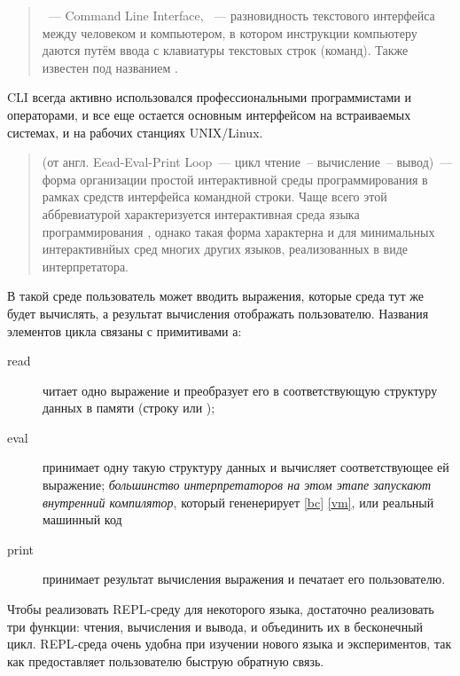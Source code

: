 \label{forth}\secdown

\begin{quotation}\noindent
{}\ --- Command Line Interface, \ ---
разновидность текстового интерфейса между человеком и компьютером, в котором
инструкции компьютеру даются путём ввода с клавиатуры текстовых строк (команд).
Также известен под названием .
\end{quotation}

\noindent
CLI всегда активно использовался профессиональными программистами и операторами,
и все еще остается основным интерфейсом на встраиваемых системах, и на рабочих
станциях UNIX/Linux.

\begin{quotation}\noindent
{} (от англ. Eead-Eval-Print Loop\ --- цикл чтение\ -- вычисление\ --
вывод)\ --- форма организации простой интерактивной среды программирования в
рамках средств интерфейса командной строки. Чаще всего этой аббревиатурой
характеризуется интерактивная среда языка программирования \lisp, однако такая
форма характерна и для минимальных интерактивнйых сред многих других языков,
реализованных в виде интерпретатора.
\end{quotation}

\clearpage
\noindent
В такой среде пользователь может вводить выражения, которые среда тут же будет
вычислять, а результат вычисления отображать пользователю. Названия элементов
цикла связаны с примитивами \lisp а:

\begin{description}
\item[read] читает одно выражение и преобразует его в соответствующую структуру
данных в памяти (строку или );
\item[eval] принимает одну такую структуру данных и вычисляет соответствующее ей
выражение; \textit{большинство интерпретаторов на этом этапе запускают
внутренний компилятор}, который гененерирует  \ref{bc}
 \ref{vm}, или реальный машинный код
\item[print] принимает результат вычисления выражения и печатает его
пользователю.
\end{description}

\noindent
Чтобы реализовать REPL-среду для некоторого языка, достаточно реализовать три
функции: чтения, вычисления и вывода, и объединить их в бесконечный цикл.
REPL-среда очень удобна при изучении нового языка и экспериментов, так как
предоставляет пользователю быструю обратную связь.

